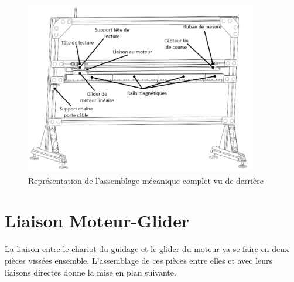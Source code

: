\begin{figure}[H]
    \centering
    \includegraphics[width = 0.9\textwidth]{assets/figures/AssemblageCompletDerriere.svg}
    \caption{Représentation de l'assemblage mécanique complet vu de derrière}
    \label{fig:AssCompDerriere}
\end{figure}

\section{Liaison Moteur-Glider}\label{sec:LiaisonMotGlid}
La liaison entre le chariot du guidage et le \gls{glider} du moteur va se faire en deux pièces vissées ensemble. L'assemblage de ces pièces
entre elles et avec leurs liaisons directes donne la mise en plan suivante.

